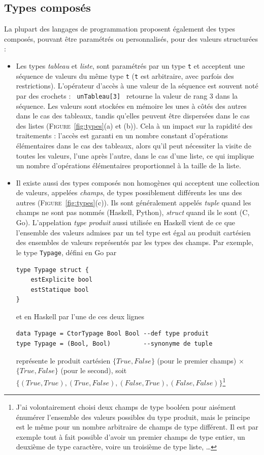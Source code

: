 \documentclass[a4paper,francais]{insalyon}
\begin{document}
\subsection{Types composés}

La plupart des langages de programmation proposent également des types composés, pouvant être paramétrés ou personnalisés, pour des valeurs structurées :
\begin{itemize}
\item Les types \emph{tableau} et \emph{liste}, sont paramétrés par un type \texttt{t} et acceptent une séquence de valeurs du même type \texttt{t} (\texttt{t} est arbitraire, avec parfois des restrictions). L'opérateur d'accès à une valeur de la séquence est souvent noté par des crochets : \verb! unTableau[3] ! retourne la valeur de rang 3 dans la séquence. Les valeurs sont stockées en mémoire les unes à côtés des autres dans le cas des tableaux, tandis qu'elles peuvent être dispersées dans le cas des listes (\textsc{Figure}~\ref{fig:types}(a) et (b)). Cela à un impact sur la rapidité des traitements : l'accès est garanti en un nombre constant d'opérations élémentaires dans le cas des tableaux, alors qu'il peut nécessiter la visite de toutes les valeurs, l'une après l'autre, dans le cas d'une liste, ce qui implique un nombre d'opérations élémentaires proportionnel à la taille de la liste.
\item Il existe aussi des types composés non homogènes qui acceptent une collection de valeurs, appelées \emph{champs}, de types possiblement différents les uns des autres (\textsc{Figure}~\ref{fig:types}(c)). Ils sont généralement appelés \emph{tuple} quand les champs ne sont pas nommés (Haskell, Python), \emph{struct} quand ils le sont (C, Go). L'appelation \emph{type produit} aussi utilisée en Haskell vient de ce que l'ensemble des valeurs admises par un tel type est égal au produit cartésien des ensembles de valeurs représentés par les types des champs. Par exemple, le type \texttt{Typage}, défini en Go par 
\begin{verbatim}
type Typage struct {
    estExplicite bool
    estStatique bool
}
\end{verbatim}
et en Haskell par l'une de ces deux lignes
\begin{verbatim}
data Typage = CtorTypage Bool Bool --def type produit
type Typage = (Bool, Bool)         --synonyme de tuple
\end{verbatim}
représente le produit cartésien $\{True, False\}$ (pour le premier champs) $\times$ $\{True, False\}$ (pour le second), soit $\{ (True, True), (True, False), (False, True), (False, False) \}$\footnote{J'ai volontairement choisi deux champs de type booléen pour aisément énumérer l'ensemble des valeurs possibles du type produit, mais le principe est le même pour un nombre arbitraire de champs de type différent. Il est par exemple tout à fait possible d'avoir un premier champs de type entier, un deuxième de type caractère, voire un troisième de type liste, \ldots}   

\end{itemize}
\end{document}
